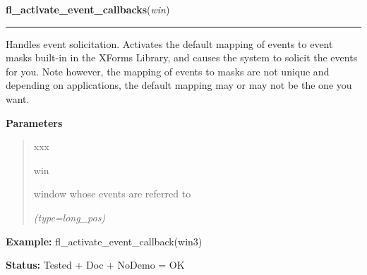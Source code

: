 \hspace{.8\funcindent}\begin{boxedminipage}{\funcwidth}

    \raggedright \textbf{fl\_activate\_event\_callbacks}(\textit{win})

    \vspace{-1.5ex}

    \rule{\textwidth}{0.5\fboxrule}
\setlength{\parskip}{2ex}
    Handles event solicitation. Activates the default mapping of events to 
    event masks built-in in the XForms Library, and causes the system to 
    solicit the events for you. Note however, the mapping of events to 
    masks are not unique and depending on applications, the default mapping
    may or may not be the one you want.

\setlength{\parskip}{1ex}
      \textbf{Parameters}
      \vspace{-1ex}

      \begin{quote}
        \begin{Ventry}{xxx}

          \item[win]

          window whose events are referred to

            {\it (type=long\_pos)}

        \end{Ventry}

      \end{quote}

\textbf{Example:} fl\_activate\_event\_callback(win3)



\textbf{Status:} Tested + Doc + NoDemo = OK



    \end{boxedminipage}

    \label{xformslib:flxbasic:fl_print_xevent_name}

    \vspace{0.5ex}

